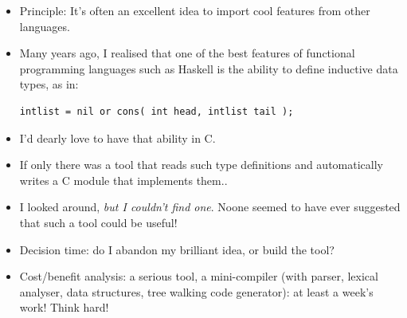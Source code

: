 \documentclass[aspectratio=169]{beamer}
\newcommand{\pitem}{\pause \item}
\begin{document}
\begin{frame}[fragile]
    \begin{itemize}
    \item
      \alert{Principle:}
      It's often an excellent idea to
      \alert{import cool features from other languages}.
    \pitem
      Many years ago, I realised that one of the best
      features of \alert{functional programming languages}
      such as Haskell is the ability to define
      \alert{inductive data types}, as in:
\begin{verbatim}
intlist = nil or cons( int head, intlist tail );
\end{verbatim}
    \pitem
      I'd dearly love to have that ability in C.

    \pitem
      If only there
      was a tool that \alert{reads such type definitions} and automatically
      writes a \alert{C module that implements them}..
    \pitem
      I looked around, {\em but I couldn't find one}.
      Noone seemed to have ever suggested that such a tool could
      be useful!
    \pitem
      Decision time: do I abandon my brilliant idea, or \alert{build the tool}?
    \pitem
      Cost/benefit analysis: a serious tool, a mini-compiler (with parser, lexical analyser,
      data structures, tree walking code generator):
      at least a week's work!  Think hard!
    \end{itemize}
\end{frame}
\end{document}
